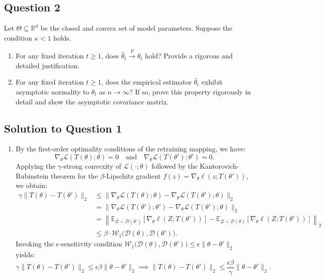 \documentclass[../../../main.tex]{subfiles}
\begin{document}
\begin{msbproblem}
\begin{problemstatement}
\subsection*{Question 2}
Let $\Theta \subseteq \mathbb{R}^d$ be the closed and convex set of model parameters. Suppose the condition $\kappa < 1$ holds.
\begin{enumerate}
    \item For any fixed iteration $t \ge 1$, does $\widehat{\theta}_t \xrightarrow{P} \theta_t$ hold? Provide a rigorous and detailed justification.
    \item For any fixed iteration $t \ge 1$, does the empirical estimator $\widehat{\theta}_t$ exhibit asymptotic normality to $\theta_t$ as $n \to \infty$? If so, prove this property rigorously in detail and show the asymptotic covariance matrix.
\end{enumerate}


\end{problemstatement}

\begin{answerkey}
\subsection*{Solution to Question 1}

\begin{enumerate}
    \item By the first-order optimality conditions of the retraining mapping, we have:
\[
\nabla_\theta \mathcal{L}(T(\theta); \theta) = 0 \quad \text{and} \quad \nabla_\theta \mathcal{L}(T(\theta'); \theta') = 0.
\]
Applying the $\gamma$-strong convexity of $\mathcal{L}(\cdot; \theta)$ followed by the Kantorovich-Rubinstein theorem for the $\beta$-Lipschitz gradient $f(z) = \nabla_\theta \ell(z; T(\theta'))$, we obtain:
\begin{align*}
\gamma \|T(\theta) - T(\theta')\|_2 & \le \| \nabla_\theta \mathcal{L}(T(\theta); \theta) - \nabla_\theta \mathcal{L}(T(\theta'); \theta) \|_2 \\
& = \| \nabla_\theta \mathcal{L}(T(\theta'); \theta') - \nabla_\theta \mathcal{L}(T(\theta'); \theta) \|_2 \\
& = \left\| \mathbb{E}_{Z \sim \mathcal{D}(\theta')}[\nabla_\theta \ell(Z; T(\theta'))] - \mathbb{E}_{Z \sim \mathcal{D}(\theta)}[\nabla_\theta \ell(Z; T(\theta'))] \right\|_2 \\
& \le \beta \cdot \mathcal{W}_1\big(\mathcal{D}(\theta), \mathcal{D}(\theta')\big).
\end{align*}
Invoking the $\epsilon$-sensitivity condition $\mathcal{W}_1\big(\mathcal{D}(\theta), \mathcal{D}(\theta')\big) \le \epsilon \|\theta - \theta'\|_2$ yields:
\[
\gamma \|T(\theta) - T(\theta')\|_2 \le \epsilon\beta \|\theta - \theta'\|_2 \implies \|T(\theta) - T(\theta')\|_2 \le \frac{\epsilon\beta}{\gamma} \|\theta - \theta'\|_2.
\]


\end{enumerate}
\end{answerkey}
\end{msbproblem}
\end{document}
